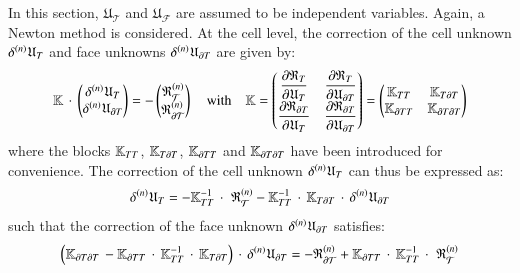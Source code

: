 In this section, $\mathfrak{U}_{\mathcal{T}}$ and
$\mathfrak{U}_{\mathcal{F}}$ are assumed to be independent variables.
Again, a Newton method is considered.
%
%
%
At the cell level, the correction of the cell unknown
$\iter{n}{\delta}\mathfrak{U}_{\cell}$ and face unknowns
$\iter{n}{\delta}\mathfrak{U}_{\dCell}$ are given by:
\begin{equation}
\label{eq_static_condensation_final}
\mathbb{K}\,\cdot\,
\begin{pmatrix}
  \iter{n}{\delta}\mathfrak{U}_{\cell}
  \\
  \iter{n}{\delta}\mathfrak{U}_{\dCell}
\end{pmatrix}
= -
\begin{pmatrix}
  \iter{n}{\mathfrak{R}}_{\mathcal{\cell}}
  \\
  \iter{n}{\mathfrak{R}}_{\mathcal{\dCell}}
\end{pmatrix}
\quad\text{with}\quad \mathbb{K} =
\begin{pmatrix}
  \deriv{\mathfrak{R}_{\cell}}{\mathfrak{U}_{\cell}}
  & \deriv{\mathfrak{R}_{\cell}}{\mathfrak{U}_{\dCell}} \\
  \deriv{\mathfrak{R}_{\dCell}}{\mathfrak{U}_{\cell}}
  & \deriv{\mathfrak{R}_{\dCell}}{\mathfrak{U}_{\dCell}} \\
\end{pmatrix}
=
\begin{pmatrix}
  \mathbb{K}_{\cell\cell} &
  \mathbb{K}_{\cell\dCell} \\
  \mathbb{K}_{\dCell\cell} &
  \mathbb{K}_{\dCell\dCell} \\
\end{pmatrix}
\end{equation}
%
%
%
where the blocks \(\mathbb{K}_{\cell\cell}\),
\(\mathbb{K}_{\cell\dCell}\), \(\mathbb{K}_{\dCell\cell}\) and
\(\mathbb{K}_{\dCell\dCell}\) have been introduced for convenience.
%
%
%
The correction of the cell unknown
$\iter{n}{\delta}\mathfrak{U}_{\cell}$ can thus be expressed as:
\begin{equation}
  \label{eq:cell_unknown_correction}
  \iter{n}{\delta}\mathfrak{U}_{\cell}=
  -\mathbb{K}_{\cell\cell}^{-1}\,\cdot\,\,\iter{n}{\mathfrak{R}}_{\mathcal{\cell}}
  -\mathbb{K}_{\cell\cell}^{-1}\,\cdot\,\mathbb{K}_{\cell\dCell}\,\cdot\,\iter{n}{\delta}\mathfrak{U}_{\dCell}
\end{equation}
%
%
%
such that the correction of the face unknown
$\iter{n}{\delta}\mathfrak{U}_{\dCell}$ satisfies:
\[
\paren{ \mathbb{K}_{\dCell\dCell}\,
  -\mathbb{K}_{\dCell\cell}\,\cdot\,\mathbb{K}_{\cell\cell}^{-1}\,\cdot\,\mathbb{K}_{\cell\dCell}
 }\,\cdot\, \iter{n}{\delta}\mathfrak{U}_{\dCell}=
-\iter{n}{\mathfrak{R}}_{\mathcal{\dCell}}
+\mathbb{K}_{\dCell\cell}\,\cdot\,\mathbb{K}_{\cell\cell}^{-1}\,\cdot\,\,\iter{n}{\mathfrak{R}}_{\mathcal{\cell}}
\]
